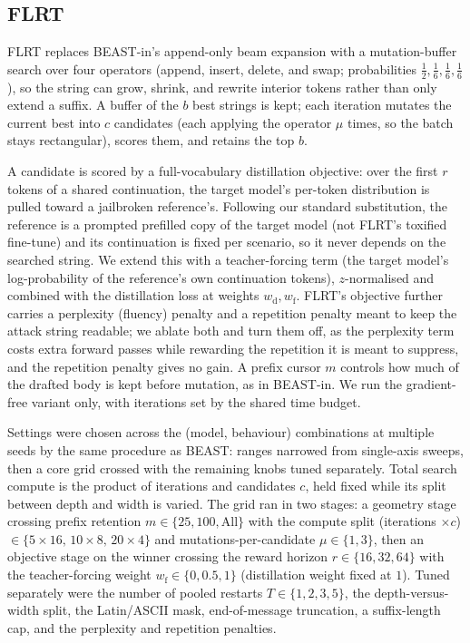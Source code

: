 \documentclass{article}
\theoremstyle{plain}
\theoremstyle{definition}
\theoremstyle{remark}
\begin{document}
\subsection{FLRT}
FLRT \citep{thompson2024flrt} replaces BEAST-in's append-only beam expansion with a mutation-buffer search over four operators (append, insert, delete, and swap; probabilities $\tfrac12, \tfrac16, \tfrac16, \tfrac16$), so the string can grow, shrink, and rewrite interior tokens rather than only extend a suffix. A buffer of the $b$ best strings is kept; each iteration mutates the current best into $c$ candidates (each applying the operator $\mu$ times, so the batch stays rectangular), scores them, and retains the top $b$.

A candidate is scored by a full-vocabulary distillation objective: over the first $r$ tokens of a shared continuation, the target model's per-token distribution is pulled toward a jailbroken reference's. Following our standard substitution, the reference is a prompted prefilled copy of the target model (not FLRT's toxified fine-tune) and its continuation is fixed per scenario, so it never depends on the searched string. We extend this with a teacher-forcing term (the target model's log-probability of the reference's own continuation tokens), $z$-normalised and combined with the distillation loss at weights $w_{\mathrm d}, w_{\mathrm f}$. FLRT's objective further carries a perplexity (fluency) penalty and a repetition penalty meant to keep the attack string readable; we ablate both and turn them off, as the perplexity term costs extra forward passes while rewarding the repetition it is meant to suppress, and the repetition penalty gives no gain. A prefix cursor $m$ controls how much of the drafted body is kept before mutation, as in BEAST-in. We run the gradient-free variant only, with iterations set by the shared time budget.

Settings were chosen across the (model, behaviour) combinations at multiple seeds by the same procedure as BEAST: ranges narrowed from single-axis sweeps, then a core grid crossed with the remaining knobs tuned separately. Total search compute is the product of iterations and candidates $c$, held fixed while its split between depth and width is varied. The grid ran in two stages: a geometry stage crossing prefix retention $m \in \{25, 100, \text{All}\}$ with the compute split (iterations $\times c$) $\in \{5\times16,\,10\times8,\,20\times4\}$ and mutations-per-candidate $\mu \in \{1, 3\}$, then an objective stage on the winner crossing the reward horizon $r \in \{16, 32, 64\}$ with the teacher-forcing weight $w_{\mathrm f} \in \{0, 0.5, 1\}$ (distillation weight fixed at $1$). Tuned separately were the number of pooled restarts $T \in \{1, 2, 3, 5\}$, the depth-versus-width split, the Latin/ASCII mask, end-of-message truncation, a suffix-length cap, and the perplexity and repetition penalties.
\end{document}
